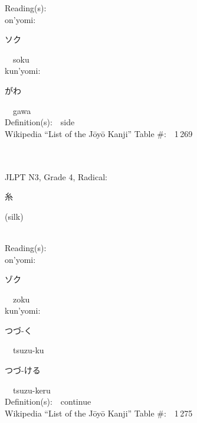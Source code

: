 \begin{multicols}{2}
Reading(s):\ \ \\
{\hspace*{1em}}on'yomi:\ \ \\
{\hspace*{2em}}{\begin{CJK}{UTF8}{min} ソク \end{CJK}}\ \ soku\ \ \\
{\hspace*{1em}}kun'yomi:\ \ \\
{\hspace*{2em}}{\begin{CJK}{UTF8}{min} がわ \end{CJK}}\ \ gawa\ \ \\
Definition(s):\ \ side \\
Wikipedia ``List of the J\=oy\=o Kanji'' Table \#:\ \ 1\,269 \\
\ \ \\
{\fontsize{34pt}{40pt}  }\ \ \\  %
{JLPT N3, Grade 4, Radical:\ \ {\begin{CJK}{UTF8}{min} 糸 \end{CJK}} (silk) } \\
Reading(s):\ \ \\
{\hspace*{1em}}on'yomi:\ \ \\
{\hspace*{2em}}{\begin{CJK}{UTF8}{min} ゾク \end{CJK}}\ \ zoku\ \ \\
{\hspace*{1em}}kun'yomi:\ \ \\
{\hspace*{2em}}{\begin{CJK}{UTF8}{min} つづ-く \end{CJK}}\ \ tsuzu-ku\ \ \\
{\hspace*{2em}}{\begin{CJK}{UTF8}{min} つづ-ける \end{CJK}}\ \ tsuzu-keru\ \ \\
Definition(s):\ \ continue \\
Wikipedia ``List of the J\=oy\=o Kanji'' Table \#:\ \ 1\,275 \\
\ \ \\

\end{multicols}
